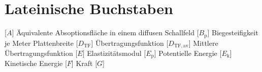 %
%
%
%
% 
%
\section*{Lateinische Buchstaben} 		%
%
\begin{acronym}[-------------------] 	%
	 	[$A$]				{\acrounit{\m\squared}
		Äquivalente Absoptionsfläche in einem diffusen Schallfeld
	} %
		[$B_{\mathrm{p}}$]	{\acrounit{\N\m}
		Biegesteifigkeit je Meter Plattenbreite
	}
	 	[$D_\mathrm{TF}$]				{\acrounit{\decibel}
		Übertragungsfunktion
	} %
	 	[$D_\mathrm{TF,av}$]				{\acrounit{\decibel}
		Mittlere Übertragungsfunktion
	} %
		[$E$]				{\acrounit{\N\per\m\squared}
		Elastizitätsmodul
	} %
		[$E_{\mathrm{p}}$]	{\acrounit{\joule}
		Potentielle Energie
	} %
		[$E_{\mathrm{k}}$]	{\acrounit{\joule}
		Kinetische Energie
	} %
		[$F$]				{\acrounit{\N}
		Kraft
	} %
		[$G$]				{\acrounit{\N\per\m\squared}
}
\end{acronym}
